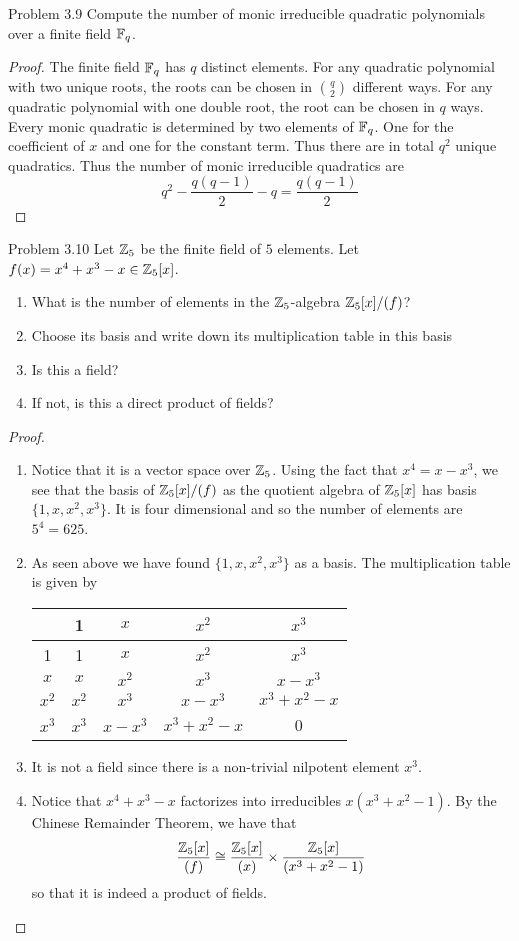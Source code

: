 \documentclass[a4paper]{article}
\begin{document}
\begin{ex}{Problem 3.9}{} Compute the number of monic irreducible quadratic polynomials over a finite field $\mathbb{F}_q$. \tcbline
\begin{proof}
The finite field $\mathbb{F}_q$ has $q$ distinct elements. For any quadratic polynomial with two unique roots, the roots can be chosen in $\binom{q}{2}$ different ways. For any quadratic polynomial with one double root, the root can be chosen in $q$ ways. Every monic quadratic is determined by two elements of $\mathbb{F}_q$. One for the coefficient of $x$ and one for the constant term. Thus there are in total $q^2$ unique quadratics. Thus the number of monic irreducible quadratics are $$q^2-\frac{q(q-1)}{2}-q=\frac{q(q-1)}{2}$$
\end{proof}
\end{ex}

\begin{ex}{Problem 3.10}{} Let $\mathbb{Z}_5$ be the finite field of $5$ elements. Let $f(x)=x^4+x^3-x\in\mathbb{Z}_5[x]$. 
\begin{enumerate}
\item What is the number of elements in the $\mathbb{Z}_5$-algebra $\mathbb{Z}_5[x]/(f)$?
\item Choose its basis and write down its multiplication table in this basis
\item Is this a field?
\item If not, is this a direct product of fields?
\end{enumerate} \tcbline
\begin{proof}~\\
\begin{enumerate}
\item Notice that it is a vector space over $\mathbb{Z}_5$. Using the fact that $x^4=x-x^3$, we see that the basis of $\mathbb{Z}_5[x]/(f)$ as the quotient algebra of $\mathbb{Z}_5[x]$ has basis $\{1,x,x^2,x^3\}$. It is four dimensional and so the number of elements are $5^4=625$. 
\item As seen above we have found $\{1,x,x^2,x^3\}$ as a basis. The multiplication table is given by 
\begin{center}
\begin{tabular}{c|cccc}
      & 1     & $x$     & $x^2$       & $x^3$       \\ \hline
1     & 1     & $x$     & $x^2$       & $x^3$       \\
$x$   & $x$   & $x^2$   & $x^3$       & $x-x^3$     \\
$x^2$ & $x^2$ & $x^3$   & $x-x^3$     & $x^3+x^2-x$ \\
$x^3$ & $x^3$ & $x-x^3$ & $x^3+x^2-x$ & 0          
\end{tabular}
\end{center}
\item It is not a field since there is a non-trivial nilpotent element $x^3$. 
\item Notice that $x^4+x^3-x$ factorizes into irreducibles $x(x^3+x^2-1)$. By the Chinese Remainder Theorem, we have that $$\frac{\mathbb{Z}_5[x]}{(f)}\cong\frac{\mathbb{Z}_5[x]}{(x)}\times\frac{\mathbb{Z}_5[x]}{(x^3+x^2-1)}$$ so that it is indeed a product of fields. 
\end{enumerate}
\end{proof}
\end{ex}
\end{document}
